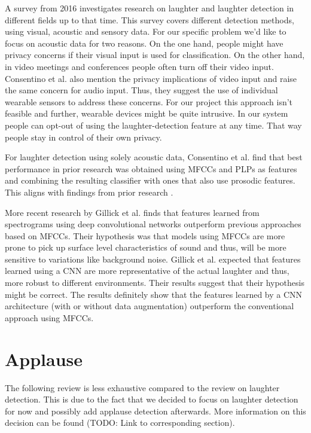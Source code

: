 \documentclass[bsc,frontabs,parskip,deptreport]{infthesis}
\begin{document}
A survey from 2016 \cite{cosentino2016quantitative} investigates research on laughter and laughter detection in different fields up to that time.
This survey covers different detection methods, using visual, acoustic and sensory data.
For our specific problem we'd like to focus on acoustic data for two reasons.
On the one hand, people might have privacy concerns if their visual input is used for classification.
On the other hand, in video meetings and conferences people often turn off their video input.
Consentino et al. \cite{cosentino2016quantitative} also mention the privacy implications of video input and raise the same concern for audio input.
Thus, they suggest the use of individual wearable sensors to address these concerns.
For our project this approach isn't feasible and further, wearable devices might be quite intrusive.
In our system people can opt-out of using the laughter-detection feature at any time.
That way people stay in control of their own privacy.

For laughter detection using solely acoustic data, Consentino et al. \cite{cosentino2016quantitative} find that best performance in prior research was obtained using MFCCs and PLPs as features and combining the resulting classifier with ones that also use prosodic features.
This aligns with findings from prior research \cite{truong2007automatic, knox2006automatic}.

More recent research by Gillick et al. \cite{gillick2021robust} finds that features learned from spectrograms using deep convolutional networks outperform previous approaches based on MFCCs.
Their hypothesis was that models using MFCCs are more prone to pick up surface level characteristics of sound and thus, will be more sensitive to variations like background noise.
Gillick et al. expected that features learned using a CNN are more representative of the actual laughter and thus, more robust to different environments. 
Their results suggest that their hypothesis might be correct.
The results definitely show that the features learned by a CNN architecture (with or without data augmentation) outperform the conventional approach using MFCCs. 


\section{Applause}
The following review is less exhaustive compared to the review on laughter detection.
This is due to the fact that we decided to focus on laughter detection for now and possibly add applause detection afterwards.
More information on this decision can be found (TODO: Link to corresponding section).
\end{document}
